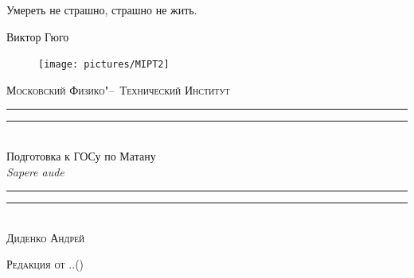 \newpage
\thispagestyle{empty}
\epigraph{Умереть не страшно, страшно не жить.}{Виктор Гюго}\centering
\vspace*{-0.7\baselineskip}  
\settowidth{\unitlength}{\LARGE\scshape Московский Физико"--~Технический Институт}
\begin{figure}[!h]
\center
\texttt{[image: pictures/MIPT2]}
\vspace{-0.5\baselineskip}
\end{figure}
{\LARGE\scshape Московский Физико"--~Технический Институт}
\rule{\unitlength}{1.7pt}\vspace*{-\baselineskip}\vspace*{2pt}
\rule{\unitlength}{0.4pt}\\[0.6\baselineskip]
{\Huge Подготовка к ГОСу по Матану}\\[0.4\baselineskip]
{\large \itshape Sapere aude}\\[0.14\baselineskip]
\rule{\unitlength}{0.4pt}\vspace*{-1.5\baselineskip}\vspace{3.2pt}
\rule{\unitlength}{1.7pt}\\[0.55\baselineskip]
{\Large\scshape Диденко Андрей \\\vspace*{0.1\baselineskip}  %
}\par
\vspace*{0.35\baselineskip}  

{\LARGE\scshape Редакция от \twodigit\day.\twodigit\month.\the\year \;(\currenttime)}\par 

